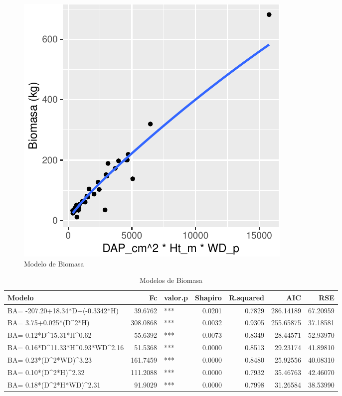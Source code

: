 \documentclass[9pt,onecolumn,twoside,]{pinp}
\begin{document}
\begin{figure}[!h]

{\centering \includegraphics{David_Londono_Lopera_Cristian_Ganan_parcial3_files/figure-latex/unnamed-chunk-23-1} 

}

\caption{Modelo de Biomasa}\label{fig:unnamed-chunk-23}
\end{figure}

\begin{table}[h]

\caption{\label{tab:unnamed-chunk-24}Modelos de Biomasa}
\centering
\begin{tabular}[t]{l|r|l|r|r|r|r}
\hline
Modelo & Fc & valor.p & Shapiro & R.squared & AIC & RSE\\
\hline
BA= -207.20+18.34*D+(-0.3342*H) & 39.6762 & *** & 0.0201 & 0.7829 & 286.14189 & 67.20959\\
\hline
BA= 3.75+0.025*(D\textasciicircum{}2*H) & 308.0868 & *** & 0.0032 & 0.9305 & 255.65875 & 37.18581\\
\hline
BA= 0.12*D\textasciicircum{}15.31*H\textasciicircum{}0.62 & 55.6392 & *** & 0.0073 & 0.8349 & 28.44571 & 52.93970\\
\hline
BA= 0.16*D\textasciicircum{}11.33*H\textasciicircum{}0.93*WD\textasciicircum{}2.16 & 51.5368 & *** & 0.0000 & 0.8513 & 29.23174 & 41.89810\\
\hline
BA= 0.23*(D\textasciicircum{}2*WD)\textasciicircum{}3.23 & 161.7459 & *** & 0.0000 & 0.8480 & 25.92556 & 40.08310\\
\hline
BA= 0.10*(D\textasciicircum{}2*H)\textasciicircum{}2.32 & 111.2088 & *** & 0.0000 & 0.7932 & 35.46763 & 42.46070\\
\hline
BA= 0.18*(D\textasciicircum{}2*H*WD)\textasciicircum{}2.31 & 91.9029 & *** & 0.0000 & 0.7998 & 31.26584 & 38.53990\\
\hline
\end{tabular}
\end{table}
\end{document}
